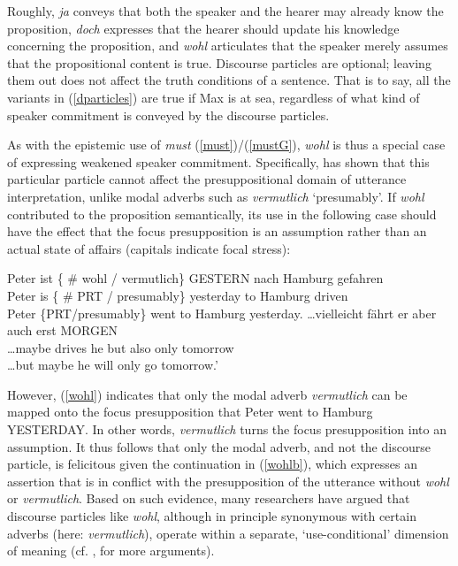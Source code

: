 \documentclass[11pt]{article}
\newcommand{\gcs}[1]{\textcolor{blue}{[gcs: #1]}}
\begin{document}
Roughly, \emph{ja} conveys that both the speaker and the hearer may already know the proposition, \emph{doch} expresses that the hearer should update his knowledge concerning the proposition, and \emph{wohl} articulates that the speaker merely assumes that the propositional content is true. Discourse particles are optional; leaving them out does not affect the truth conditions of a sentence. That is to say, all the variants in (\ref{dparticles}) are true if Max is at sea, regardless of what kind of speaker commitment is conveyed by the discourse particles.


As with the epistemic use of \emph{must} (\ref{must})/(\ref{mustG}), \emph{wohl} is thus a special case of expressing weakened speaker commitment. Specifically, \cite{Zimmermann2004, Zimmermann2008} has shown that this particular particle cannot affect the presuppositional domain of utterance interpretation, unlike modal adverbs such as \emph{vermutlich} `presumably'. If \emph{wohl} contributed to the proposition semantically, its use in the following case should have the effect that the focus presupposition is an assumption rather than an actual state of affairs (capitals indicate focal stress):

\begin{exe}
\ex \label{wohl}
\begin{xlist}
\ex \gll Peter	ist	\{ \#	wohl  /	vermutlich\}	GESTERN			nach	 Hamburg	 gefahren	\\
		Peter	is		\{ \#	PRT  /   presumably\}	yesterday 		to	 Hamburg	 driven	\\	
\glt Peter \{PRT/presumably\} went to Hamburg yesterday.
\ex \label{wohlb} \gll \ldots vielleicht fährt er aber	auch erst MORGEN\\
\ldots maybe drives he but also only tomorrow\\
\glt \ldots but maybe he will only go tomorrow.' 
\end{xlist}
\end{exe}
	
	
However, (\ref{wohl}) indicates that only the modal adverb \emph{vermutlich} can be mapped onto the focus presupposition that Peter went to Hamburg YESTERDAY. In other words, \emph{vermutlich} turns the focus presupposition into an assumption. It thus follows that only the modal adverb, and not the discourse particle, is felicitous given the continuation in (\ref{wohlb}), which expresses an assertion that is in conflict with the presupposition of the utterance without \emph{wohl} or \emph{vermutlich}. Based on such evidence, many researchers have argued that discourse particles like \emph{wohl}, although in principle synonymous with certain adverbs (here: \emph{vermutlich}), operate within a separate, `use-conditional' dimension of meaning (cf. \citealp[][pp.~215--268]{Gutzmann2015}, for more arguments).
\end{document}

